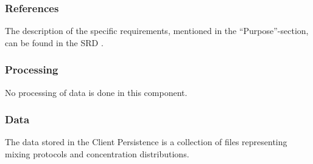 \subsubsection*{References}
The description of the specific requirements, mentioned in the ``Purpose''-section, can be found in the SRD \cite{srd}.

\subsubsection*{Processing}
No processing of data is done in this component.

\subsubsection*{Data}
The data stored in the Client Persistence is a collection of files representing mixing protocols and concentration distributions.








